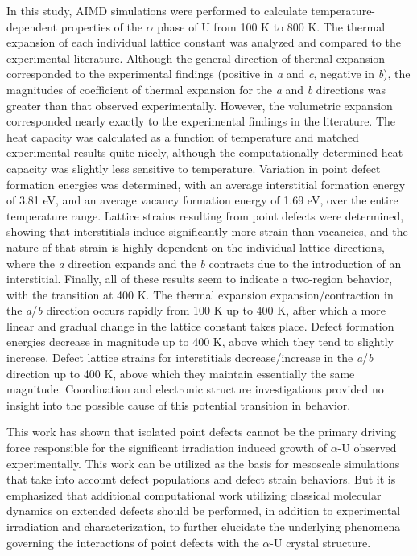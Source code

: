 \documentclass[review]{elsarticle}
\begin{document}
In this study, AIMD simulations were performed to calculate temperature-dependent properties of the $\alpha$ phase of U from 100 K to 800 K. The thermal expansion of each individual lattice constant was analyzed and compared to the experimental literature. Although the general direction of thermal expansion corresponded to the experimental findings (positive in \textit{a} and \textit{c}, negative in \textit{b}), the magnitudes of coefficient of thermal expansion for the \textit{a} and \textit{b} directions was greater than that observed experimentally. However, the volumetric expansion corresponded nearly exactly to the experimental findings in the literature. The heat capacity was calculated as a function of temperature and matched experimental results quite nicely, although the computationally determined heat capacity was slightly less sensitive to temperature. Variation in point defect formation energies was determined, with an average interstitial formation energy of 3.81 eV, and an average vacancy formation energy of 1.69 eV, over the entire temperature range. Lattice strains resulting from point defects were determined, showing that interstitials induce significantly more strain than vacancies, and the nature of that strain is highly dependent on the individual lattice directions, where the \textit{a} direction expands and the \textit{b} contracts due to the introduction of an interstitial. Finally, all of these results seem to indicate a two-region behavior, with the transition at 400 K. The thermal expansion expansion/contraction in the \textit{a}/\textit{b} direction occurs rapidly from 100 K up to 400 K, after which a more linear and gradual change in the lattice constant takes place. Defect formation energies decrease in magnitude up to 400 K, above which they tend to slightly increase. Defect lattice strains for interstitials decrease/increase in the \textit{a}/\textit{b} direction up to 400 K, above which they maintain essentially the same magnitude. Coordination and electronic structure investigations provided no insight into the possible cause of this potential transition in behavior. 

This work has shown that isolated point defects cannot be the primary driving force responsible for the significant irradiation induced growth of $\alpha$-U observed experimentally. This work can be utilized as the basis for mesoscale simulations that take into account defect populations and defect strain behaviors. But it is emphasized that additional computational work utilizing classical molecular dynamics on extended defects should be performed, in addition to experimental irradiation and characterization, to further elucidate the underlying phenomena governing the interactions of point defects with the $\alpha$-U crystal structure. 
\end{document}
